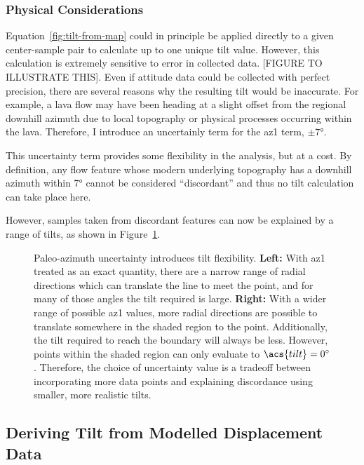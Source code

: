 \subsubsection{Physical Considerations}

Equation~\eqref{fig:tilt-from-map} could in principle be applied directly to a given center-sample pair to calculate up to one unique tilt value. However, this calculation is extremely sensitive to error in collected data. [FIGURE TO ILLUSTRATE THIS]. Even if attitude data could be collected with perfect precision, there are several reasons why the resulting tilt would be inaccurate. For example, a lava flow may have been heading at a slight offset from the regional downhill azimuth due to local topography or physical processes occurring within the lava. Therefore, I introduce an uncertainly term for the \acs{az1} term, $\pm\ang{7}$. 

This uncertainty term provides some flexibility in the analysis, but at a cost. By definition, any flow feature whose modern underlying topography has a downhill azimuth within \ang{7} cannot be considered ``discordant'' and thus no tilt calculation can take place here.

However, samples taken from discordant features can now be explained by a range of tilts, as shown in Figure~\ref{fig:tilt-range}.

\begin{figure}
    \caption{Paleo-azimuth uncertainty introduces tilt flexibility. \textbf{Left:} With \acs{az1} treated as an exact quantity, there are a narrow range of radial directions which can translate the line to meet the point, and for many of those angles the tilt required is large. \textbf{Right:} With a wider range of possible \acs{az1} values, more radial directions are possible to translate somewhere in the shaded region to the point. Additionally, the tilt required to reach the boundary will always be less. However, points within the shaded region can only evaluate to $\acs{tilt}=\ang{0}$. Therefore, the choice of uncertainty value is a tradeoff between incorporating more data points and explaining discordance using smaller, more realistic tilts.}%
    \label{fig:tilt-range}
\end{figure}

\subsection{Deriving Tilt from Modelled Displacement Data}

